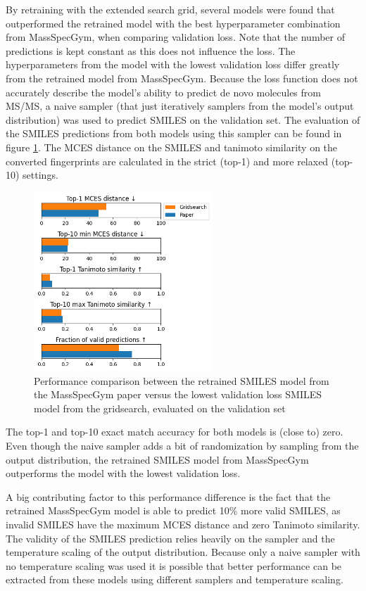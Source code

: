 By retraining with the extended search grid, several models were found that outperformed the retrained model with the best hyperparameter combination from MassSpecGym, when comparing validation loss.
Note that the number of predictions is kept constant as this does not influence the loss.
The hyperparameters from the model with the lowest validation loss differ greatly from the retrained model from MassSpecGym. %
Because the loss function does not accurately describe the model's ability to predict de novo molecules from \ac{MS/MS},
a naive sampler (that just iteratively samplers from the model's output distribution) was used to predict SMILES on the validation set.
The evaluation of the SMILES predictions from both models using this sampler can be found in figure \ref{fig:gridsearch_vs_paper}.
The MCES distance on the SMILES and tanimoto similarity on the converted fingerprints are calculated in the strict (top-1) and more relaxed (top-10) settings.

\begin{figure}[h]
    \centering
    \includegraphics[width=0.6\textwidth]{figures/results/gridsearch_vs_paper.png}
    \caption{Performance comparison between the retrained SMILES model from the MassSpecGym paper versus the lowest validation loss SMILES model from the gridsearch, evaluated on the validation set}
    \label{fig:gridsearch_vs_paper}
\end{figure}

The top-1 and top-10 exact match accuracy for both models is (close to) zero.
Even though the naive sampler adds a bit of randomization by sampling from the output distribution, the retrained SMILES model from MassSpecGym outperforms the model with the lowest validation loss.

A big contributing factor to this performance difference is the fact that the retrained MassSpecGym model is able to predict 10\% more valid SMILES, as invalid SMILES have the maximum MCES distance and zero Tanimoto similarity.
The validity of the SMILES prediction relies heavily on the sampler and the temperature scaling of the output distribution.
Because only a naive sampler with no temperature scaling was used it is possible that better performance can be extracted from these models using different samplers and temperature scaling.


